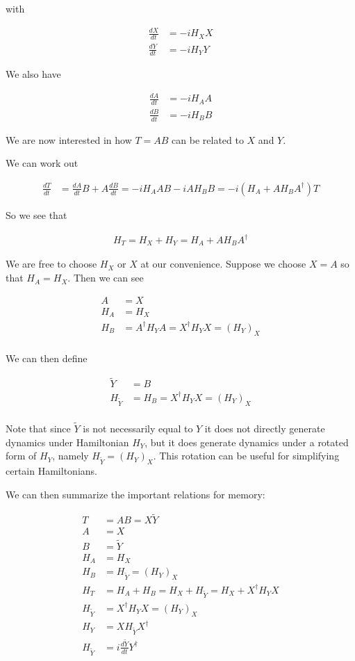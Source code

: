 \documentclass[12pt]{article}
\newcommand{\ddt}[1]{\frac{d #1}{dt}}
\begin{document}
with

\begin{align}
\ddt{X} &= -i H_X X\\
\ddt{Y} &= -i H_Y Y
\end{align}

We also have

\begin{align}
\ddt{A} &= -i H_A A\\
\ddt{B} &= -i H_B B
\end{align}

We are now interested in how $T=AB$ can be related to $X$ and $Y$.

We can work out

\begin{align}
\ddt{T} &= \ddt{A} B + A \ddt{B} = -i H_A AB -i AH_B B = -i(H_A + A H_B A^{\dag}) T
\end{align}

So we see that

\begin{align}
H_T = H_X + H_Y = H_A + AH_BA^{\dag}
\end{align}

We are free to choose $H_X$ or $X$ at our convenience. Suppose we choose $X = A$ so that $H_A = H_X$. Then we can see

\begin{align}
A &= X\\
H_A &= H_X\\
H_B &= A^{\dag} H_Y A = X^{\dag} H_Y X = (H_Y)_X\\
\end{align}

We can then define

\begin{align}
\tilde{Y} &= B\\
H_{\tilde{Y}} &= H_B = X^{\dag}H_Y X = (H_Y)_X\\
\end{align}

Note that since $\tilde{Y}$ is not necessarily equal to $Y$ it does not directly generate dynamics under Hamiltonian $H_Y$, but it does generate dynamics under a rotated form of $H_Y$, namely $H_{\tilde{Y}} = (H_Y)_X$. This rotation can be useful for simplifying certain Hamiltonians.

We can then summarize the important relations for memory:

\begin{align}
T &= AB = X\tilde{Y}\\
A &= X\\
B &= \tilde{Y}\\
H_A &= H_X\\
H_B &= H_{\tilde{Y}} = (H_Y)_X\\
H_T &= H_A + H_B = H_X + H_{\tilde{Y}} = H_X + X^{\dag} H_Y X\\
H_{\tilde{Y}} &= X^{\dag} H_Y X = (H_Y)_X\\
H_Y &= X H_{\tilde{Y}} X^{\dag}\\
H_{\tilde{Y}} &= i\ddt{\tilde{Y}}Y^{\dag}\\
\end{align}
\end{document}
